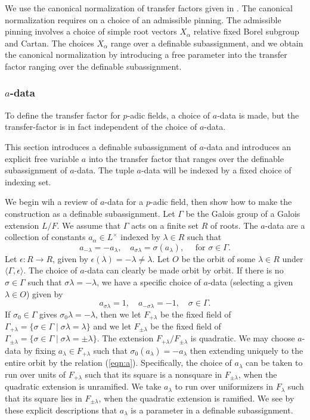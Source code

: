 We use the canonical normalization of transfer factors given in \cite[\S7]{hales1993simple}.  The canonical normalization requires
on a choice of an admissible pinning.  The admissible pinning involves a choice of simple root vectors $X_\alpha$ relative fixed Borel subgroup and Cartan.
The choices $X_\alpha$ range over a definable subassignment, and we obtain the canonical normalization by introducing a free
parameter into the transfer factor ranging over the definable subassignment.

\subsubsection{$a$-data}

To define the transfer factor for $p$-adic  fields, a choice of $a$-data is made, but the transfer-factor is in fact independent of the choice of $a$-data.

This section introduces a definable subassignment of $a$-data and introduces an explicit free variable $a$ into the transfer factor that ranges over
the definable subassignment of $a$-data.  The tuple $a$-data will be indexed by a fixed choice of indexing set.  

We begin wih a review of $a$-data for a $p$-adic field, then show how to make the construction as a definable subassignment.
Let $\Gamma$ be the Galois group of a Galois extension $L/F$.  We assume that $\Gamma$ acts on a finite set $R$ of roots.
The $a$-data are a collection of constants $a_\alpha\in L^\times$ indexed by $\lambda\in R$ such that
\begin{equation}\label{eqn:a}
a_{-\lambda} = -a_\lambda,\quad a_{\sigma\lambda} = \sigma(a_\lambda),\quad \text{ for } \sigma\in \Gamma.
\end{equation}
Let $\epsilon:R\to R$, given by $\epsilon(\lambda)=-\lambda\ne\lambda$.  Let $O$ be the orbit of some $\lambda\in R$ under $\langle\Gamma,\epsilon\rangle$.
The choice of $a$-data can clearly be made orbit by orbit.
If there is no $\sigma\in \Gamma$ such that $\sigma\lambda=-\lambda$, we have a specific choice of $a$-data (selecting a given $\lambda\in O$) given by
\[
a_{\sigma\lambda}=1,\quad a_{-\sigma\lambda}=-1,\quad \sigma\in\Gamma.
\]
If $\sigma_0\in\Gamma$ gives $\sigma_0\lambda=-\lambda$,  then we let $F_{+\lambda}$ be the fixed field of $\Gamma_{+\lambda} = \{\sigma\in\Gamma\mid \sigma\lambda=\lambda\}$
and we let
$F_{\pm\lambda}$ be the fixed field of $\Gamma_{\pm\lambda} = \{\sigma\in\Gamma\mid \sigma\lambda=\pm\lambda\}$.
The extension $F_{+\lambda}/F_{\pm\lambda}$ is quadratic.
We may choose $a$-data by fixing $a_\lambda\in F_{+\lambda}$ such that $\sigma_0(a_\lambda) = -a_\lambda$ then extending uniquely to the entire orbit  by the relation (\ref{eqn:a}).
Specifically, the choice of $a_\lambda$ can be taken to run over units of $F_{+\lambda}$ such that its square is a nonsquare in $F_{\pm\lambda}$, when the quadratic extension is unramified.
We take $a_\lambda$ to run over uniformizers in $F_{\lambda}$ such that its square lies in $F_{\pm\lambda}$, when the quadratic extension is ramified.
We see by these explicit descriptions that $a_\lambda$ is a parameter in a definable subassignment.


